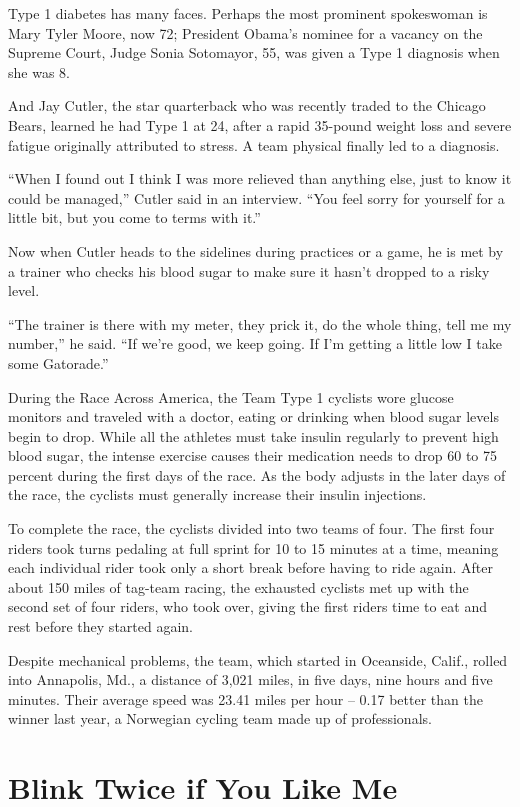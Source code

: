 ﻿\documentclass[12pt]{article}
\begin{document}
Type 1 diabetes has many faces. Perhaps the most prominent spokeswoman is Mary Tyler Moore, now 72;
President Obama's nominee for a vacancy on the Supreme Court, Judge Sonia Sotomayor, 55, was given a
Type 1 diagnosis when she was 8.

And Jay Cutler, the star quarterback who was recently traded to the Chicago Bears, learned he had
Type 1 at 24, after a rapid 35-pound weight loss and severe fatigue originally attributed to stress.
A team physical finally led to a diagnosis.

``When I found out I think I was more relieved than anything else, just to know it could be
managed,'' Cutler said in an interview. ``You feel sorry for yourself for a little bit, but you come
to terms with it.''

Now when Cutler heads to the sidelines during practices or a game, he is met by a trainer who checks
his blood sugar to make sure it hasn't dropped to a risky level.

``The trainer is there with my meter, they prick it, do the whole thing, tell me my number,'' he
said. ``If we're good, we keep going. If I'm getting a little low I take some Gatorade.''

During the Race Across America, the Team Type 1 cyclists wore glucose monitors and traveled with a
doctor, eating or drinking when blood sugar levels begin to drop. While all the athletes must take
insulin regularly to prevent high blood sugar, the intense exercise causes their medication needs to
drop 60 to 75 percent during the first days of the race. As the body adjusts in the later days of
the race, the cyclists must generally increase their insulin injections.

To complete the race, the cyclists divided into two teams of four. The first four riders took turns
pedaling at full sprint for 10 to 15 minutes at a time, meaning each individual rider took only a
short break before having to ride again. After about 150 miles of tag-team racing, the exhausted
cyclists met up with the second set of four riders, who took over, giving the first riders time to
eat and rest before they started again.

Despite mechanical problems, the team, which started in Oceanside, Calif., rolled into Annapolis,
Md., a distance of 3,021 miles, in five days, nine hours and five minutes. Their average speed was
23.41 miles per hour -- 0.17 better than the winner last year, a Norwegian cycling team made up of professionals.

\section{Blink Twice if You Like Me}
\end{document}
